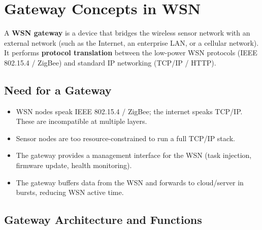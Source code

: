 \documentclass[12pt,a4paper]{article}
\begin{document}
\section{Gateway Concepts in WSN}

\begin{tcolorbox}[defbox, title={\textbf{WSN Gateway --- Definition}}]
A \textbf{WSN gateway} is a device that bridges the wireless sensor network with an external network (such as the Internet, an enterprise LAN, or a cellular network). It performs \textbf{protocol translation} between the low-power WSN protocols (IEEE 802.15.4 / ZigBee) and standard IP networking (TCP/IP / HTTP).
\end{tcolorbox}

\subsection{Need for a Gateway}

\begin{itemize}[leftmargin=*, itemsep=3pt]
  \item WSN nodes speak IEEE 802.15.4 / ZigBee; the internet speaks TCP/IP. These are incompatible at multiple layers.
  \item Sensor nodes are too resource-constrained to run a full TCP/IP stack.
  \item The gateway provides a management interface for the WSN (task injection, firmware update, health monitoring).
  \item The gateway buffers data from the WSN and forwards to cloud/server in bursts, reducing WSN active time.
\end{itemize}

\subsection{Gateway Architecture and Functions}
\end{document}
